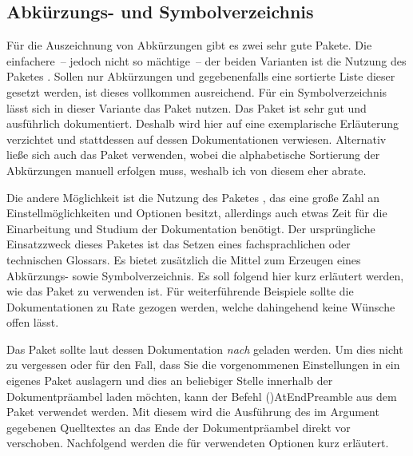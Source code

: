 \documentclass[%
  english,ngerman,%
  cdgeometry=no,DIV=12,%
  cd=false,cdfont=false,cdtitle=true,%
  headings=normal,%
  automark,%
  listof=toc,%
]{tudscrartcl}
\begin{document}
\subsection{%
  Abkürzungs- und Symbolverzeichnis%
  \label{sec:glossaries}%
}

Für die Auszeichnung von Abkürzungen gibt es zwei sehr gute Pakete. Die 
einfachere~-- jedoch nicht so mächtige~-- der beiden Varianten ist die Nutzung 
des Paketes . Sollen nur Abkürzungen und gegebenenfalls eine 
sortierte Liste dieser gesetzt werden, ist dieses vollkommen ausreichend. Für 
ein Symbolverzeichnis lässt sich in dieser Variante das Paket  
nutzen. Das Paket  ist sehr gut und ausführlich dokumentiert. 
Deshalb wird hier auf eine exemplarische Erläuterung verzichtet und stattdessen 
auf dessen Dokumentationen verwiesen. Alternativ ließe sich auch das Paket 
 verwenden, wobei die alphabetische Sortierung der Abkürzungen 
manuell erfolgen muss, weshalb ich von diesem eher abrate.

Die andere Möglichkeit ist die Nutzung des Paketes , das 
eine große Zahl an Einstellmöglichkeiten und Optionen besitzt, allerdings auch 
etwas Zeit für die Einarbeitung und Studium der Dokumentation benötigt. Der 
ursprüngliche Einsatzzweck dieses Paketes ist das Setzen eines fachsprachlichen 
oder technischen Glossars. Es bietet zusätzlich die Mittel zum Erzeugen eines 
Abkürzungs- sowie Symbolverzeichnis. Es soll folgend hier kurz erläutert 
werden, wie das Paket zu verwenden ist. Für weiterführende Beispiele sollte 
die Dokumentationen zu Rate gezogen werden, welche dahingehend keine Wünsche 
offen lässt. 

Das Paket  sollte laut dessen Dokumentation \emph{nach} 
 geladen werden. Um dies nicht zu vergessen oder für den 
Fall, dass Sie die vorgenommenen Einstellungen in ein eigenes Paket auslagern 
und dies an beliebiger Stelle innerhalb der Dokumentpräambel laden möchten, 
kann der Befehl \Macro(){AtEndPreamble} aus dem Paket 
 verwendet werden. Mit diesem wird die Ausführung des im 
Argument gegebenen Quelltextes an das Ende der Dokumentpräambel direkt vor 
 verschoben. Nachfolgend werden die für 
 verwendeten Optionen kurz erläutert.
%
\begin{Code}[nolst]{preamble}
\AtEndPreamble{%
\end{Code}
\begin{Code}{preamble}
\usepackage[%
\end{Code}
\end{document}
